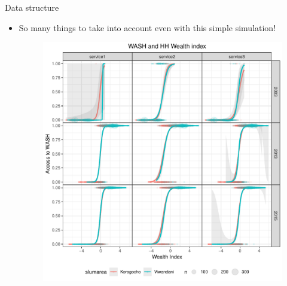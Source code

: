 \documentclass{beamer}
\begin{document}
\begin{frame}{Data structure}
\begin{itemize}[<+->]
\item So many things to take into account even with this simple simulation!
\pause
\begin{figure}[H]
\centering
\includegraphics[scale = 0.4]{git_push/wealthindex_plot.pdf}
\end{figure}
\end{itemize}
\end{frame}
\end{document}

